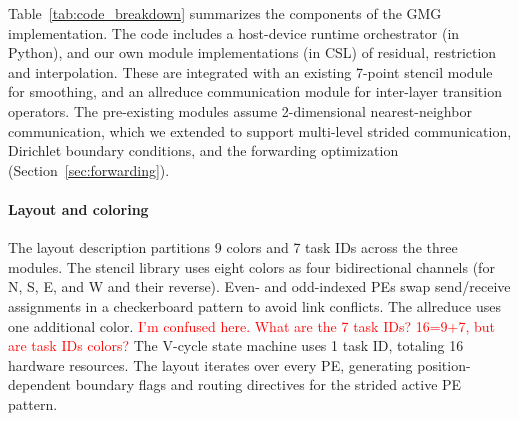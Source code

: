 \documentclass[conference]{IEEEtran}
\begin{document}
         

Table~\ref{tab:code_breakdown} summarizes the components of the GMG implementation. 
The code includes a host-device runtime orchestrator (in Python), and our own module  implementations (in CSL) of residual, restriction and interpolation.  These are integrated with an existing 7-point stencil module for smoothing, and an allreduce communication module for inter-layer transition operators.  %
The pre-existing modules assume 2-dimensional nearest-neighbor communication, which we extended to support multi-level strided communication, Dirichlet boundary conditions, and the forwarding optimization  (Section~\ref{sec:forwarding}). %
            

                

            \paragraph{Layout and coloring}
                The layout description partitions 9 colors and 7 task IDs across the three modules. The stencil library uses eight colors
                as four bidirectional channels (for N, S, E, and W and their reverse). %
                Even- and odd-indexed PEs swap send/receive assignments in a checkerboard pattern to avoid link
                conflicts. The allreduce uses one additional color. %
                \textcolor{red}{I'm confused here.  What are the 7 task IDs?  16=9+7, but are task IDs colors?}
                The
                V-cycle state machine uses 1 task ID, totaling 16 hardware resources. The layout iterates over every PE, generating
                position-dependent boundary flags and routing directives for the strided active PE pattern. %
\end{document}
